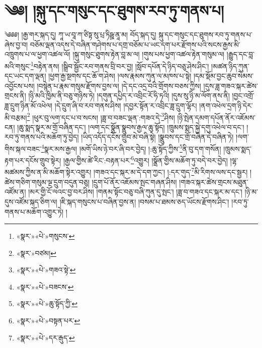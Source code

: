 \chapter{༄༅། །སྐུ་དང་གསུང་དང་ཐུགས་རབ་ཏུ་གནས་པ།}༄༅༅། །རྒྱ་གར་སྐད་དུ། ཀཱ་ཡ་བཱ་ཀ་ཙིཏྟ་སུ་པྲ་ཏིཥྛ་ནཱ་མ། བོད་སྐད་དུ། སྐུ་དང་གསུང་དང་ཐུགས་རབ་ཏུ་གནས་པ་ཞེས་བྱ་བ། བཅོམ་ལྡན་འདས་དེ་བཞིན་གཤེགས་པ་དགྲ་བཅོམ་པ་ཡང་དག་པར་རྫོགས་པའི་སངས་རྒྱས་མི་འཁྲུགས་པ་ལ་ཕྱག་འཚལ་ལོ། །སྐུ་གསུང་ཐུགས་རྟེན་བླ་མ་ལ། །གུས་པས་ཕྱག་འཚལ་རྟེན་གསུམ་ལ། །རྒྱུད་དང་བླ་མའི་གསུང་\footnote{«སྣར་»«པེ་»གསུངས་}བརྟེན་ནས། །སྒྲིབ་སྦྱོང་རབ་གནས་བྲི་བར་བྱ། །སློབ་དཔོན་དེ་ཉིད་བཅུ་ཤེས་ཤིང་། །མཚན་ཉིད་ཀུན་དང་ཡང་དག་ལྡན། །ཕྱག་རྒྱ་སྔགས་དང་ཆོ་ག་ཤེས། །ལས་རྣམས་ཀུན་ལ་མཁས་པ་སྟེ། །དམ་སྡོམ་བྱང་ཆུབ་སེམས་འབྱོངས་པས། །བསྙེན་པ་རྣམ་གསུམ་རྫོགས་བྱས་ལ། །དེ་དང་འདྲ་བའི་གྲོགས་བཅས་ཀྱིས། །དུས་ཟླ་གཟའ་སྐར་ཚེས་གྲངས་ནི། །ཉི་མའི་ཁྱིམ་ནི་བཅུ་གཉིས་ཏེ། །དགུན་དཔྱིད་ར་འབྲིང་རོ་ཧི་ཏའི། །དུས་སུ་ཉི་མ་ལོག་ནས་ནི། །བྱང་འགྲོ་ཟླ་དྲུག་ཉིན་མོ་འཕེལ། །དེ་དྲུག་ཞི་བ་རབ་གནས་ཤིས། །དབྱར་སྟོན་ར་འབྲིང་ཟླ་དྲུག་ལྷོར། །ནག་འཕེལ་དྲག་ཉི་དེར་མི་བརྩམ།\footnote{«སྣར་»བཙམ།} །ཕུར་བུ་ལག་དང་པ་བ་སངས། །ཟླ་བ་བཟང་ལྡན་:གཟའ་དེ་\footnote{«སྣར་»«པེ་»གཟའ་སྟེ་}ཤིས། །ཉི་སྤེན་དམག་དཔོན་ནོར་འཇོམས་ངན། །ཆུ་སྨད་སྣར་མ་གྲོ་བཞིན་དང་། །ལག་དང་སྣྲོན་སྣྲུབས་རྒྱལ་ཆུ་སྟོད། །ཁྲུམས་སྨད་སྐྱེ་དགུ་འཕེལ་བ་དང་། །རབ་ཏུ་གནས་པའི་མཆོག་ཏུ་བྱེད། །ཡིད་འདོད་དངོས་གྲུབ་མེ་བཞི་སྟེ། །སྣྲུབས་དང་གྲོ་བཞིན་དེ་བཞིན་ཏེ། །ལག་གིས་སྐལ་བཟང་\footnote{«སྣར་»«པེ་»བཟངས་}སྣར་མས་རྒྱལ། །མགོ་ཡིས་ཉེ་བར་ཞི་བར་བྱེད། །:ཆུ་སྟོད་ཀྱིས་\footnote{«སྣར་»«པེ་»ཆུ་སྟོད་ཀྱི་}ནི་བུ་དག་གསོན། །ཁྲུམས་སྨད་རྟག་པར་དངོས་གྲུབ་སྟེར། །རྒྱལ་གྱིས་ཚེ་རིང་:བརྟན་པར་\footnote{«སྣར་»«པེ་»བསྟན་པར་}འགྱུར། །སྣྲོན་གྱིས་མཆོག་ཏུ་བདེ་བར་བྱེད། །ལྷ་མཚམས་ཀྱིས་ན་མི་མཆོག་སྟེར་འགྱུར། །གཟའ་དང་སྐར་མ་དེ་དག་ཀྱང་། །:དར་གུད་\footnote{«སྣར་»«པེ་»དར་རྒུད་}མི་རིགས་ལས་དང་སྦྱར། །ཚེས་གཅིག་གསུམ་ལྔ་དྲུག་བདུན་བཅུ། །དྲུག་པོ་ནོར་འཇོམས་སྤང་གཞན་ཤིས། །གཟའ་སྐར་ཚེས་གྲངས་མཐུན་འཛོམ་ན། །མར་གྱི་ངོ་ལའང་བྱ་བར་ཤིས། །གནམ་སྟོང་བཅུ་བཞི་ཀུན་དུ་སྤང་། །ཟླ་བ་གཟའ་དང་སྐར་མ་དང་། །ཉི་མ་དུས་འཛོམ་སྐད་ཅིག་ལ། །ཇི་སྐད་གསུངས་པ་བཞིན་བྱས་ན། །བསམ་པ་ཐམས་ཅད་ཡོངས་རྫོགས་ཤིང་། །རབ་ཏུ་གནས་པ་མཆོག་འགྱུར་ཏེ། །
